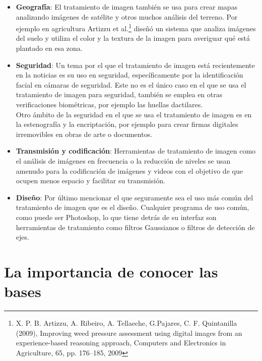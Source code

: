 \documentclass[a4paper,12pt]{report}
\begin{document}
\begin{itemize}
\item \textbf{Geografía}: El tratamiento de imagen también se usa para crear mapas analizando imágenes de satélite y otros muchos análisis del terreno. Por ejemplo en agricultura Artizzu et al.\footnote{X. P. B. Artizzu, A. Ribeiro, A. Tellaeche, G.Pajares, C. F. Quintanilla (2009), Improving weed pressure assessment using digital images from an experience-based reasoning approach, Computers and Electronics in Agriculture, 65, pp. 176–185,
2009} diseñó un sistema que analiza imágenes del suelo y utiliza el color y la textura de la imagen para averiguar qué está plantado en esa zona.\\

\item \textbf{Seguridad}: Un tema por el que el tratamiento de imagen está recientemente en la noticias es su uso en seguridad, específicamente por la identificación facial en cámaras de seguridad. Este no es el único caso en el que se usa el tratamiento de imagen para seguridad, también se emplea en otras verificaciones biométricas, por ejemplo las huellas dactilares.\\

Otro ámbito de la seguridad en el que se usa el tratamiento de imagen es en la estenografía y la encriptación, por ejemplo para crear firmas digitales irremovibles en obras de arte o documentos.\\

\item \textbf{Transmisión y codificación}: Herramientas de tratamiento de imagen como el análisis de imágenes en frecuencia o  la reducción de niveles se usan amenudo para la codificación de imágenes y videos con el objetivo de que ocupen menos espacio y facilitar su transmisión.\\

\item \textbf{Diseño}: Por último mencionar el que seguramente sea el uso más común del tratamiento de imagen que es el diseño. Cualquier programa de uso común, como puede ser Photoshop, lo que tiene detrás de su interfaz son herramientas de tratamiento como filtros Gaussianos o filtros de detección de ejes.\\

\end{itemize}


\section{La importancia de conocer las bases}
\end{document}
